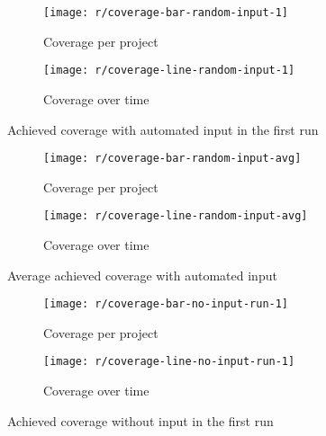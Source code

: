 \begin{figure}[htpb]
    \centering
    \begin{subfigure}{.8\textwidth}
        \texttt{[image: r/coverage-bar-random-input-1]}
        \caption{Coverage per project}
        \label{fig:coverage_bar}
    \end{subfigure}

    \bigskip

    \begin{subfigure}{.8\textwidth}
        \texttt{[image: r/coverage-line-random-input-1]}
        \caption{Coverage over time}
        \label{fig:coverage_line}
    \end{subfigure}

    \caption{Achieved coverage with automated input in the first run}
    \label{fig:coverage}
\end{figure}

\begin{figure}[htpb]
    \centering
    \begin{subfigure}{.8\textwidth}
        \texttt{[image: r/coverage-bar-random-input-avg]}
        \caption{Coverage per project}
        \label{fig:coverage_bar}
    \end{subfigure}

    \bigskip

    \begin{subfigure}{.8\textwidth}
        \texttt{[image: r/coverage-line-random-input-avg]}
        \caption{Coverage over time}
        \label{fig:coverage_line}
    \end{subfigure}

    \caption{Average achieved coverage with automated input}
    \label{fig:coverage}
\end{figure}

\begin{figure}[htpb]
    \centering
    \begin{subfigure}{.8\textwidth}
        \texttt{[image: r/coverage-bar-no-input-run-1]}
        \caption{Coverage per project}
        \label{fig:coverage_no_input_bar}
    \end{subfigure}

    \bigskip

    \begin{subfigure}{.8\textwidth}
        \texttt{[image: r/coverage-line-no-input-run-1]}
        \caption{Coverage over time}
        \label{fig:coverage_no_input_line}
    \end{subfigure}

    \caption{Achieved coverage without input in the first run}
    \label{fig:coverage_no_input}
\end{figure}

